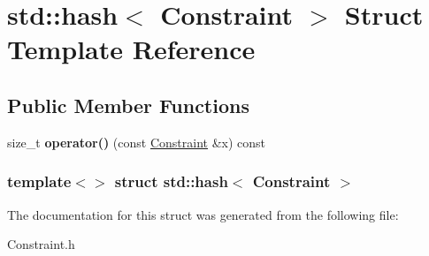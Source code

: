 \hypertarget{structstd_1_1hash_3_01Constraint_01_4}{\section{std\-:\-:hash$<$ \-Constraint $>$ \-Struct \-Template \-Reference}
\label{structstd_1_1hash_3_01Constraint_01_4}
}
\subsection*{\-Public \-Member \-Functions}
\begin{DoxyCompactItemize}
\item 
\hypertarget{structstd_1_1hash_3_01Constraint_01_4_a72d6d1680af85773821b5b55d3575591}{size\-\_\-t {\bfseries operator()} (const \hyperlink{classConstraint}{\-Constraint} \&x) const }\label{structstd_1_1hash_3_01Constraint_01_4_a72d6d1680af85773821b5b55d3575591}

\end{DoxyCompactItemize}
\subsubsection*{template$<$$>$ struct std\-::hash$<$ Constraint $>$}



\-The documentation for this struct was generated from the following file\-:\begin{DoxyCompactItemize}
\item 
\-Constraint.\-h\end{DoxyCompactItemize}

